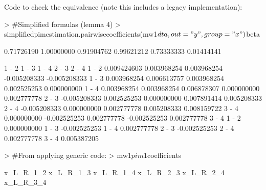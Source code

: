 \documentclass[12pt]{article}
\begin{document}
Code to check the equivalence (note this includes a legacy implementation):
\begin{Schunk}
\begin{Sinput}
> 	#Simplified formulas (lemma 4)
> 	simplifiedpimestimation.pairwisecoefficients(mw1$dta, out="y", group="x")$beta
\end{Sinput}
\begin{Soutput}
[1] 0.71726190 1.00000000 0.91904762 0.99621212 0.73333333 0.01414141
\end{Soutput}
\begin{Soutput}
             1 - 2        1 - 3       1 - 4        2 - 3        2 - 4
1 - 2  0.009424603  0.003968254 0.003968254 -0.005208333 -0.005208333
1 - 3  0.003968254  0.006613757 0.003968254  0.002525253  0.000000000
1 - 4  0.003968254  0.003968254 0.006878307  0.000000000  0.002777778
2 - 3 -0.005208333  0.002525253 0.000000000  0.007891414  0.005208333
2 - 4 -0.005208333  0.000000000 0.002777778  0.005208333  0.008159722
3 - 4  0.000000000 -0.002525253 0.002777778 -0.002525253  0.002777778
             3 - 4
1 - 2  0.000000000
1 - 3 -0.002525253
1 - 4  0.002777778
2 - 3 -0.002525253
2 - 4  0.002777778
3 - 4  0.005387205
\end{Soutput}
\begin{Sinput}
> 	#From applying generic code:
> 	mw1$pim1$coefficients
\end{Sinput}
\begin{Soutput}
 x_L_R_1_2  x_L_R_1_3  x_L_R_1_4  x_L_R_2_3  x_L_R_2_4  x_L_R_3_4 

\end{Soutput}
\end{Schunk}
\end{document}
